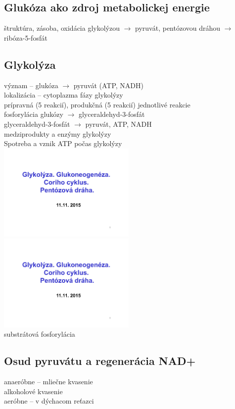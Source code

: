 \subsection*{Glukóza ako zdroj metabolickej energie}
štruktúra, zásoba, oxidácia glykolýzou $\rightarrow$ pyruvát, pentózovou dráhou $\rightarrow$ ribóza-5-fosfát\\
\subsection*{Glykolýza}
\tab význam -- glukóza $\rightarrow$ pyruvát (ATP, NADH)\\
\tab lokalizácia -- cytoplazma
 fázy glykolýzy\\
\tab \tab prípravná (5 reakcií), produkčná (5 reakcií)
\tab jednotlivé reakcie\\
\tab \tab fosforylácia glukózy $\rightarrow$ glyceraldehyd-3-fosfát\\
\tab \tab glyceraldehyd-3-fosfát $\rightarrow$ pyruvát, ATP, NADH\\
\tab medziprodukty a enzýmy glykolýzy\\
Spotreba a vznik ATP počas glykolýzy\\
\includegraphics[width=0.5\textwidth, page=6]{materials/Biochemia/Prezentacie_Biochemia/06_Glyko_Gluko_Pento.pdf}
\includegraphics[width=0.5\textwidth, page=7]{materials/Biochemia/Prezentacie_Biochemia/06_Glyko_Gluko_Pento.pdf}
\\
substrátová fosforylácia\\
\subsection*{Osud pyruvátu a regenerácia NAD+}
anaeróbne -- mliečne kvasenie\\
alkoholové kvasenie\\
aeróbne -- v dýchacom reťazci\\
